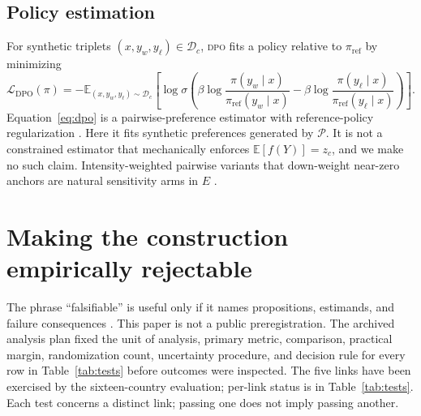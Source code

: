 \documentclass[10pt,letterpaper]{article}
\newcommand{\E}{\mathbb{E}}
\newcommand{\Pcal}{\mathcal{P}}
\newcommand{\Dcal}{\mathcal{D}}
\newcommand{\DPO}{\textsc{dpo}}
\begin{document}
\subsection{Policy estimation}
For synthetic triplets $(x,y_w,y_\ell)\in\Dcal_c$, \DPO{} fits a policy relative to $\pi_{\mathrm{ref}}$ by minimizing
\begin{equation}
\mathcal{L}_{\mathrm{DPO}}(\pi)= -\E_{(x,y_w,y_\ell)\sim\Dcal_c}\left[\log\sigma\!\left(\beta\log\frac{\pi(y_w\mid x)}{\pi_{\mathrm{ref}}(y_w\mid x)}-\beta\log\frac{\pi(y_\ell\mid x)}{\pi_{\mathrm{ref}}(y_\ell\mid x)}\right)\right].
\label{eq:dpo}
\end{equation}
Equation~\eqref{eq:dpo} is a pairwise-preference estimator with reference-policy regularization \cite{rafailov2023}. Here it fits synthetic preferences generated by $\Pcal$. It is not a constrained estimator that mechanically enforces $\E[f(Y)]=z_c$, and we make no such claim. Intensity-weighted pairwise variants that down-weight near-zero anchors are natural sensitivity arms in $E$ \cite{sharifnassab2024}.

\section{Making the construction empirically rejectable}
The phrase ``falsifiable'' is useful only if it names propositions, estimands, and failure consequences \cite{dell2026,cvprofiles2026}. This paper is not a public preregistration. The archived analysis plan fixed the unit of analysis, primary metric, comparison, practical margin, randomization count, uncertainty procedure, and decision rule for every row in Table~\ref{tab:tests} before outcomes were inspected. The five links have been exercised by the sixteen-country evaluation; per-link status is in Table~\ref{tab:tests}. Each test concerns a distinct link; passing one does not imply passing another.
\end{document}
